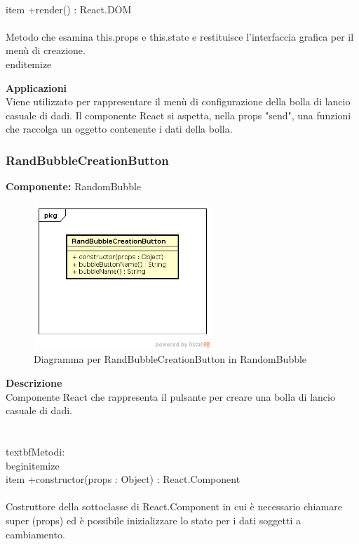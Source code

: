 \\item +render() : React.DOM \\\\
Metodo che esamina this.props e this.state e restituisce l'interfaccia grafica per il menù di creazione.
\\end{itemize} 


\textbf{Applicazioni}\\
Viene utilizzato per rappresentare il menù di configurazione della bolla di lancio casuale di dadi. Il componente React si aspetta, nella props "send", una funzioni che raccolga un oggetto contenente i dati della bolla. 


\clearpage

\subsubsection{RandBubbleCreationButton}
\textbf{Componente:}  RandomBubble\\
   \FloatBarrier
   \begin{figure}[ht]
   \centering
   \includegraphics[width=0.6\textwidth]{img/single-RandBubbleCreationButton}
   \caption{{Diagramma per RandBubbleCreationButton in RandomBubble}}
\end{figure}
\FloatBarrier
\textbf{Descrizione}\\
Componente React che rappresenta il pulsante per creare una bolla di lancio casuale di dadi.
\\\\
\\textbf{Metodi:} 
\\begin{itemize}
\\item +constructor(props : Object) : React.Component 
\\\\
Costruttore della sottoclasse di React.Component in cui è necessario chiamare super (props) ed è possibile inizializzare lo stato per i dati soggetti a cambiamento.

